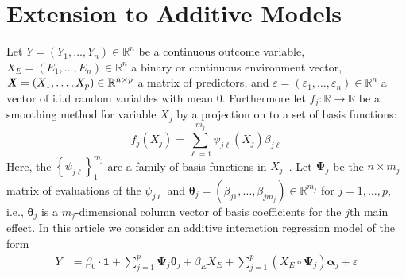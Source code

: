 \documentclass[12pt,letter]{article}\usepackage[]{graphicx}\usepackage[]{color}
\newcommand{\bX}{\textbf{\emph{X}}}
\newcommand{\balpha}{\boldsymbol{\alpha}}
\newcommand{\e}{{\mathsf E}}
\newcommand{\bmu}{\boldsymbol{\mu}}
\newcommand{\btheta}{\boldsymbol{\theta}}
\newcommand{\bPsi}{\boldsymbol{\Psi}}
\begin{document}
\section{Extension to Additive Models}
Let $Y=(Y_1, \ldots, Y_n) \in \mathbb{R}^n$ be a continuous outcome variable, \mbox{$X_E=(E_1, \ldots, E_n) \in \mathbb{R}^n$} a binary or continuous environment vector, \mbox{$\bX = (X_{1}, \ldots, X_{p}) \in \mathbb{R}^{n\times p}$} a matrix of predictors, and $\varepsilon = (\varepsilon_1, \ldots, \varepsilon_n) \in \mathbb{R}^n$ a vector of i.i.d random variables with mean 0. Furthermore let $f_j: \mathbb{R} \rightarrow \mathbb{R}$ be a smoothing method for variable $X_j$ by a projection on to a set of basis functions:
\begin{equation}
	f_j(X_j) = \sum_{\ell = 1}^{m_j} \psi_{j\ell}(X_j) \beta_{j\ell} \label{eq:smooth}
\end{equation}
Here, the $\left\lbrace \psi_{j\ell} \right\rbrace_1^{m_j}$ are a family of basis functions in $X_j$~\citep{hastie2015statistical}. Let $\bPsi_j$ be the $n \times m_j$ matrix of evaluations of the $\psi_{j\ell}$ and \mbox{$\btheta_j = (\beta_{j1}, \ldots, \beta_{jm_j}) \in \mathbb{R}^{m_j}$} for $j = 1, \ldots, p$, i.e., $\btheta_j$ is a $m_j$-dimensional column vector of basis coefficients for the $j$th main effect. In this article we consider an additive interaction regression model of the form 
\begin{align}
	Y  & =  \beta_0 \cdot \boldsymbol{1} + \sum_{j=1}^p \bPsi_j \btheta_j + \beta_E X_E + \sum_{j=1}^p (X_E \circ \bPsi_j) \balpha_{j}  + \varepsilon  \label{eq:linpred}
\end{align}

\end{document}
